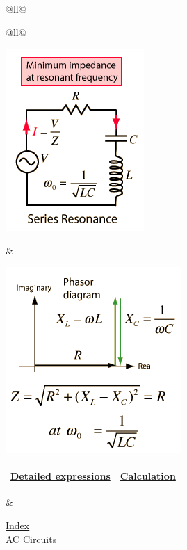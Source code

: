 \begin{longtable}[]{@{}ll@{}}
\begin{minipage}[t]{0.48\columnwidth}
\begin{longtable}[]{@{}ll@{}}
\toprule
\begin{minipage}[t]{0.48\columnwidth}\raggedright\strut
\includegraphics{./resonant-rlc-circuits_files/acres2.png}\strut
\end{minipage} & \begin{minipage}[t]{0.48\columnwidth}\raggedright\strut
\includegraphics{./resonant-rlc-circuits_files/acres3.png}

\begin{longtable}[]{@{}ll@{}}
\toprule
\href{http://hyperphysics.phy-astr.gsu.edu/hbase/electric/rlcser.html\#c1}{Detailed
expressions} &
\href{http://hyperphysics.phy-astr.gsu.edu/hbase/electric/rlcser.html\#c2}{Calculation}\tabularnewline
\bottomrule
\end{longtable}\strut
\end{minipage}\tabularnewline
\bottomrule
\end{longtable}\strut
\end{minipage} & \begin{minipage}[t]{0.48\columnwidth}\raggedright\strut
\href{http://hyperphysics.phy-astr.gsu.edu/hbase/hframe.html}{Index}\\[2\baselineskip]\href{http://hyperphysics.phy-astr.gsu.edu/hbase/electric/accircon.html\#c1}{AC
Circuits}\strut
\end{minipage}\tabularnewline
\begin{minipage}[t]{0.48\columnwidth}\raggedright\strut
~


\end{minipage}
\end{longtable}
